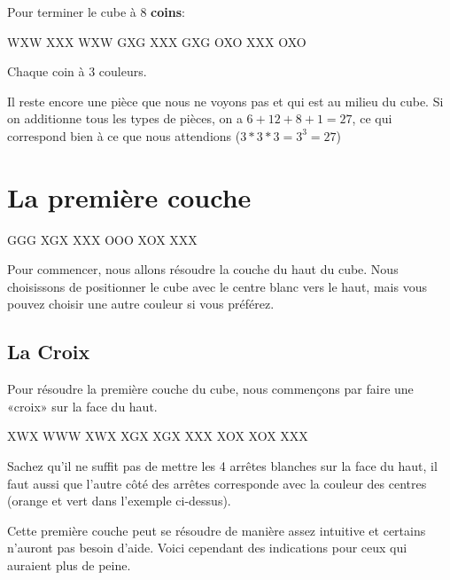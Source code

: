 \documentclass[10pt,paper=a5,pagesize]{scrbook}
\begin{document}
Pour terminer le cube à 8 \textbf{coins}:

\begin{center}
	\RubikFaceUp%
	{W}{X}{W}%
	{X}{X}{X}%
	{W}{X}{W}
	\RubikFaceRight%
	{G}{X}{G}%
	{X}{X}{X}%
	{G}{X}{G}
	\RubikFaceFront%
	{O}{X}{O}%
	{X}{X}{X}%
	{O}{X}{O}
\end{center}

Chaque coin à 3 couleurs.

Il reste encore une pièce que nous ne voyons pas et qui est au milieu du cube. Si on additionne tous les types de pièces, on a $6 + 12 + 8 + 1 = 27$, ce qui correspond bien à ce que nous attendions ($ 3 * 3 * 3 = 3^3 = 27$)

\chapter{La première couche}

{
\centering
{}
\RubikFaceRight%
{G}{G}{G}%
{X}{G}{X}%
{X}{X}{X}
\RubikFaceFront%
{O}{O}{O}%
{X}{O}{X}%
{X}{X}{X}
\par
}
\medskip

Pour commencer, nous allons résoudre la couche du haut du cube. Nous choisissons de positionner
le cube avec le centre blanc vers le haut, mais vous pouvez choisir une autre couleur si vous préférez.


\section{La Croix}

Pour résoudre la première couche du cube, nous commençons
par faire une «croix» sur la face du haut.

\begin{center}
\RubikFaceUp%
{X}{W}{X}%
{W}{W}{W}%
{X}{W}{X}
\RubikFaceRight%
{X}{G}{X}%
{X}{G}{X}%
{X}{X}{X}
\RubikFaceFront%
{X}{O}{X}%
{X}{O}{X}%
{X}{X}{X}
\end{center}

Sachez qu'il ne suffit pas de mettre les 4 arrêtes blanches sur la face du haut, il faut aussi
que l'autre côté des arrêtes corresponde avec la couleur des centres (orange et vert dans l'exemple ci-dessus).

Cette première couche peut se résoudre de manière assez intuitive et certains n'auront pas besoin
d'aide. Voici cependant des indications pour ceux qui auraient plus de peine.
\end{document}

